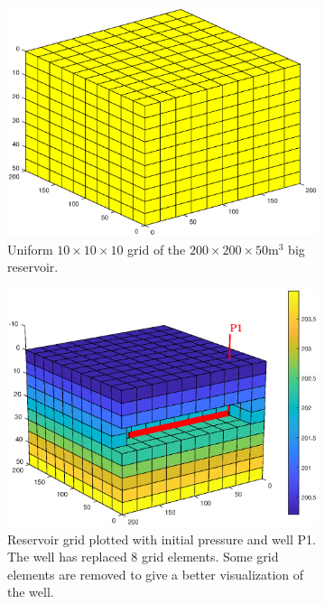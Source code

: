 \begin{figure}[htbp]
    \centering
    \begin{subfigure}[t]{0.48\textwidth}
        \centering
        \includegraphics[width = \textwidth]{figures/flowSolver_grid.eps}
        \caption{Uniform $10\times 10 \times 10$ grid of the $200\times 200 \times 50 \text{m}^3$ big reservoir.}
        \label{fig:flowSolverGrid}
    \end{subfigure}
    \begin{subfigure}[t]{0.49\textwidth}
        \centering
        \includegraphics[width = \textwidth]{figures/flowSolver_gridWithWell.eps}
        \caption{Reservoir grid plotted with initial pressure and well P1. The well has replaced 8 grid elements. Some grid elements are removed to give a better visualization of the well.}
        \label{fig:flowSolverGridWithWell}
    \end{subfigure}
    \caption{}
\end{figure}

